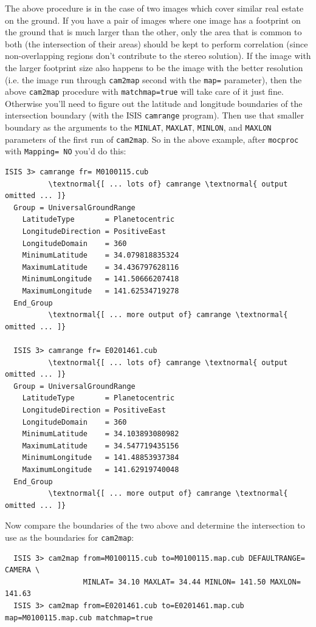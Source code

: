 The above procedure is in the case of two images which cover similar
real estate on the ground.  If you have a pair of images where one
image has a footprint on the ground that is much larger than the
other, only the area that is common to both (the intersection of their
areas) should be kept to perform correlation (since non-overlapping
regions don't contribute to the stereo solution).  If the image with
the larger footprint size also happens to be the image with the better
resolution (i.e. the image run through \texttt{cam2map} second with
the \texttt{map=} parameter), then the above \texttt{cam2map}
procedure with \texttt{matchmap=true} will take care of it just fine.
Otherwise you'll need to figure out the latitude and longitude
boundaries of the intersection boundary (with the \ac{ISIS}
\texttt{camrange} program).  Then use that smaller boundary as the
arguments to the \texttt{MINLAT}, \texttt{MAXLAT}, \texttt{MINLON},
and \texttt{MAXLON} parameters of the first run of \texttt{cam2map}.
So in the above example, after \texttt{mocproc} with \texttt{Mapping=
  NO} you'd do this:

\begin{Verbatim}[commandchars=\\\{\}]
  ISIS 3> camrange fr= M0100115.cub
          \textnormal{[ ... lots of} camrange \textnormal{ output omitted ... ]}
  Group = UniversalGroundRange
    LatitudeType       = Planetocentric
    LongitudeDirection = PositiveEast
    LongitudeDomain    = 360
    MinimumLatitude    = 34.079818835324
    MaximumLatitude    = 34.436797628116
    MinimumLongitude   = 141.50666207418
    MaximumLongitude   = 141.62534719278
  End_Group
          \textnormal{[ ... more output of} camrange \textnormal{ omitted ... ]}

  ISIS 3> camrange fr= E0201461.cub
          \textnormal{[ ... lots of} camrange \textnormal{ output omitted ... ]}
  Group = UniversalGroundRange
    LatitudeType       = Planetocentric
    LongitudeDirection = PositiveEast
    LongitudeDomain    = 360
    MinimumLatitude    = 34.103893080982
    MaximumLatitude    = 34.547719435156
    MinimumLongitude   = 141.48853937384
    MaximumLongitude   = 141.62919740048
  End_Group
          \textnormal{[ ... more output of} camrange \textnormal{ omitted ... ]}
\end{Verbatim}

Now compare the boundaries of the two above and determine the intersection to use as the boundaries for \texttt{cam2map}:

\begin{Verbatim}
  ISIS 3> cam2map from=M0100115.cub to=M0100115.map.cub DEFAULTRANGE= CAMERA \
                  MINLAT= 34.10 MAXLAT= 34.44 MINLON= 141.50 MAXLON= 141.63
  ISIS 3> cam2map from=E0201461.cub to=E0201461.map.cub map=M0100115.map.cub matchmap=true
\end{Verbatim}

